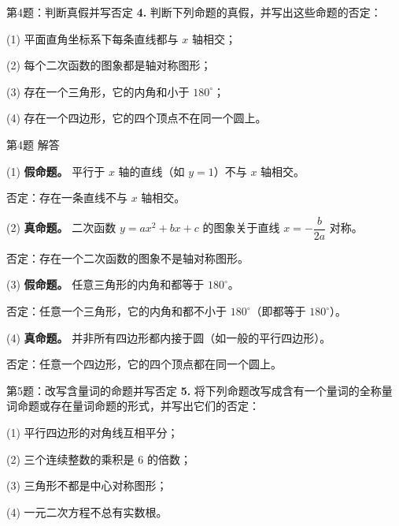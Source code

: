 \documentclass[10pt,aspectratio=169,serif]{beamer}
\begin{document}
\begin{frame}[t]{第4题：判断真假并写否定}
\textbf{4.} 判断下列命题的真假，并写出这些命题的否定：

\vspace{0.5em}
(1) 平面直角坐标系下每条直线都与 $x$ 轴相交；

\vspace{0.3em}
(2) 每个二次函数的图象都是轴对称图形；

\vspace{0.3em}
(3) 存在一个三角形，它的内角和小于 $180^\circ$；

\vspace{0.3em}
(4) 存在一个四边形，它的四个顶点不在同一个圆上。
\end{frame}

\begin{frame}[t]{第4题 解答}
\begin{tcolorbox}[colback=orange!10,colframe=orange,title=\textbf{解}]
(1) \textbf{假命题。} 平行于 $x$ 轴的直线（如 $y = 1$）不与 $x$ 轴相交。

\vspace{0.3em}
否定：存在一条直线不与 $x$ 轴相交。

\vspace{0.6em}
(2) \textbf{真命题。} 二次函数 $y = ax^2 + bx + c$ 的图象关于直线 $x = -\dfrac{b}{2a}$ 对称。

\vspace{0.3em}
否定：存在一个二次函数的图象不是轴对称图形。

\vspace{0.6em}
(3) \textbf{假命题。} 任意三角形的内角和都等于 $180^\circ$。

\vspace{0.3em}
否定：任意一个三角形，它的内角和都不小于 $180^\circ$（即都等于 $180^\circ$）。

\vspace{0.6em}
(4) \textbf{真命题。} 并非所有四边形都内接于圆（如一般的平行四边形）。

\vspace{0.3em}
否定：任意一个四边形，它的四个顶点都在同一个圆上。
\end{tcolorbox}
\end{frame}

\begin{frame}[t]{第5题：改写含量词的命题并写否定}
\textbf{5.} 将下列命题改写成含有一个量词的全称量词命题或存在量词命题的形式，并写出它们的否定：

\vspace{0.5em}
(1) 平行四边形的对角线互相平分；

\vspace{0.3em}
(2) 三个连续整数的乘积是 $6$ 的倍数；

\vspace{0.3em}
(3) 三角形不都是中心对称图形；

\vspace{0.3em}
(4) 一元二次方程不总有实数根。
\end{frame}
\end{document}
